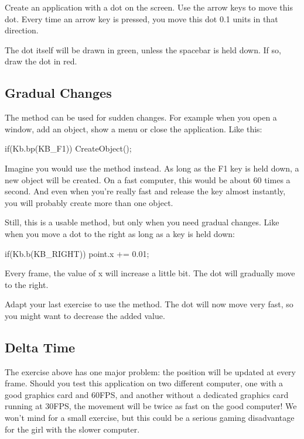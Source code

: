 \begin{exercise}
Create an application with a dot on the screen. Use the arrow keys to move this dot. Every time an arrow key is pressed, you move this dot 0.1 units in that direction.

The dot itself will be drawn in green, unless the spacebar is held down. If so, draw the dot in red.
\end{exercise}

\subsection{Gradual Changes}
\label{chapter:keyboardInteractie}
The method  can be used for sudden changes. For example when you open a window, add an object, show a menu or close the application. Like this:

\begin{code}
if(Kb.bp(KB_F1)) CreateObject();
\end{code}

Imagine you would use the method  instead. As long as the F1 key is held down, a new object will be created. On a fast computer, this would be about 60 times a second. And even when you're really fast and release the key almost instantly, you will probably create more than one object.

Still, this is a usable method, but only when you need gradual changes. Like when you move a dot to the right as long as a key is held down:

\begin{code}
if(Kb.b(KB_RIGHT)) point.x += 0.01;
\end{code}

Every frame, the value of x will increase a little bit. The dot will gradually move to the right.

\begin{exercise}
Adapt your last exercise to use the  method. The dot will now move very fast, so you might want to decrease the added value.
\end{exercise}

\subsection{Delta Time}
The exercise above has one major problem: the position will be updated at every frame. Should you test this application on two different computer, one with a good graphics card and 60FPS, and another without a dedicated graphics card running at 30FPS, the movement will be twice as fast on the good computer! We won't mind for a small exercise, but this could be a serious gaming disadvantage for the girl with the slower computer.

